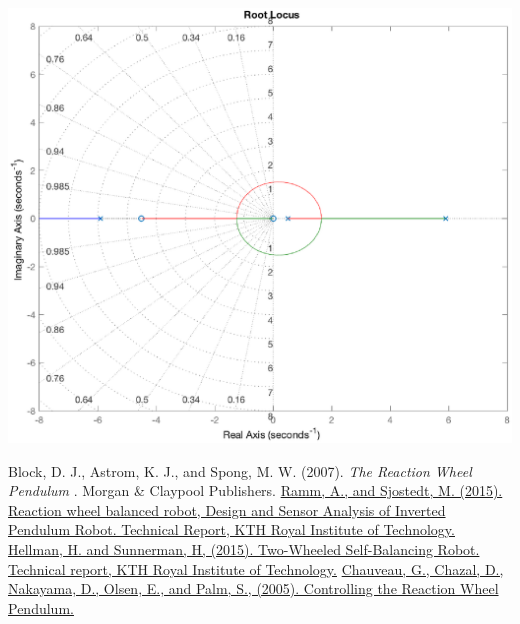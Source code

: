 \documentclass[12pt,letterpaper]{article}
\begin{document}
\includegraphics[width=\textwidth]{images/rootLocusFull.eps} 
    \label{rootLocusFull}









 
\begin{thebibliography}{99}
 Block, D. J., Astrom, K. J., and Spong, M. W. (2007).  \emph{The Reaction Wheel Pendulum} . Morgan \& Claypool Publishers.
 \href{http://www.diva-portal.se/smash/get/diva2:916271/FULLTEXT01.pdf}{Ramm, A., and Sjostedt, M. (2015). Reaction wheel balanced robot, Design and Sensor Analysis of Inverted Pendulum Robot. Technical Report, KTH Royal Institute of Technology.}
 \href{https://kth.diva-portal.org/smash/get/diva2:916184/FULLTEXT01.pdf}{Hellman, H. and Sunnerman, H, (2015).  Two-Wheeled Self-Balancing Robot. Technical report, KTH Royal Institute of Technology.}
 \href{http://geoffrey.chauveau.free.fr/pendulum/reports/final_report.pdf}{Chauveau, G., Chazal, D., Nakayama, D., Olsen, E., and Palm, S., (2005).  Controlling the Reaction Wheel Pendulum.}
\end{thebibliography}
\end{document}
